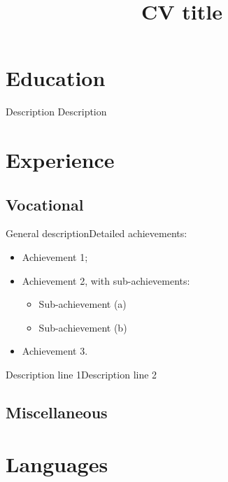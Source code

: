 \documentclass[11pt,a4paper,sans]{moderncv}
\title{CV title}
\begin{document}
\makecvtitle
\section{Education}
%
  {Description}
%
  {Description}
\section{Experience}
\subsection{Vocational}
%
  {General description\newline{}Detailed achievements:%
\begin{itemize}%
  \item Achievement 1;
  \item Achievement 2, with sub-achievements:
    \begin{itemize}%
    \item Sub-achievement (a)
    \item Sub-achievement (b)
  \end{itemize}
\item Achievement 3.
\end{itemize}}
  {Description line 1\newline{}Description line 2}
\subsection{Miscellaneous}
\section{Languages}
\end{document}
